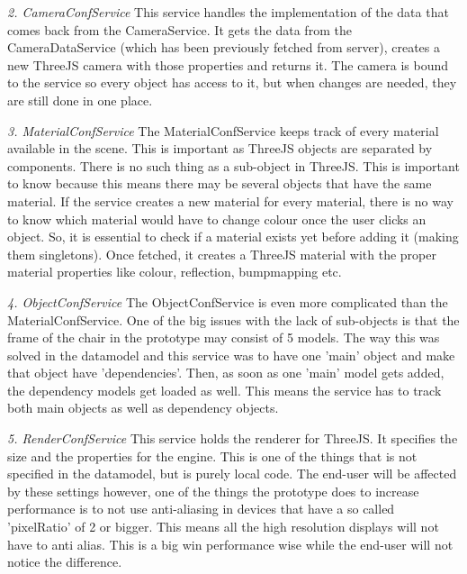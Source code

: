 \textit{2. CameraConfService} \newline
This service handles the implementation of the data that comes back from the CameraService. It gets the data from the CameraDataService (which has been previously fetched from server), creates a new ThreeJS camera with those properties and returns it. The camera is bound to the service so every object has access to it, but when changes are needed, they are still done in one place.

\textit{3. MaterialConfService} \newline
The MaterialConfService keeps track of every material available in the scene. This is important as ThreeJS objects are separated by components. There is no such thing as a sub-object in ThreeJS. This is important to know because this means there may be several objects that have the same material. If the service creates a new material for every material, there is no way to know which material would have to change colour once the user clicks an object. So, it is essential to check if a material exists yet before adding it (making them singletons). Once fetched, it creates a ThreeJS material with the proper material properties like colour, reflection, bumpmapping etc.

\textit{4. ObjectConfService} \newline
The ObjectConfService is even more complicated than the MaterialConfService. One of the big issues with the lack of sub-objects is that the frame of the chair in the prototype may consist of 5 models. The way this was solved in the datamodel and this service was to have one 'main' object and make that object have 'dependencies'. Then, as soon as one 'main' model gets added, the dependency models get loaded as well. This means the service has to track both main objects as well as dependency objects.

\textit{5. RenderConfService} \newline
This service holds the renderer for ThreeJS. It specifies the size and the properties for the engine. This is one of the things that is not specified in the datamodel, but is purely local code. The end-user will be affected by these settings however, one of the things the prototype does to increase performance is to not use anti-aliasing in devices that have a so called 'pixelRatio' of 2 or bigger. This means all the high resolution displays will not have to anti alias. This is a big win performance wise while the end-user will not notice the difference.

